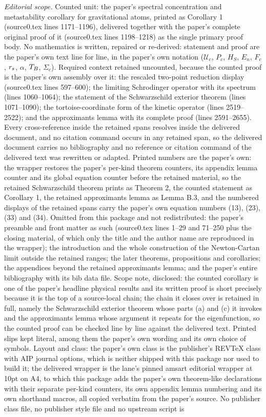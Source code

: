 \documentclass[10pt,a4paper]{amsart}
\theoremstyle{definition}
\theoremstyle{remark}
\begin{document}
\noindent\textit{Editorial scope.} Counted unit: the paper's spectral concentration and metastability corollary for gravitational atoms, printed as Corollary 1 (source0.tex lines 1171--1196), delivered together with the paper's complete original proof of it (source0.tex lines 1198--1218) as the single primary proof body. No mathematics is written, repaired or re-derived: statement and proof are the paper's own text line for line, in the paper's own notation ($\mathcal{U}_c$, $P_c$, $H_S$, $E_n$, $F_c$, $r_{\rm s}$, $\alpha$, $T_{\rm B}$, $\Sigma_c$). Required context retained uncounted, because the counted proof is the paper's own assembly over it: the rescaled two-point reduction display (source0.tex lines 597--600); the limiting Schrodinger operator with its spectrum (lines 1060--1064); the statement of the Schwarzschild exterior theorem (lines 1071--1090); the tortoise-coordinate form of the kinetic operator (lines 2519--2522); and the approximants lemma with its complete proof (lines 2591--2655). Every cross-reference inside the retained spans resolves inside the delivered document, and no citation command occurs in any retained span, so the delivered document carries no bibliography and no reference or citation command of the delivered text was rewritten or adapted. Printed numbers are the paper's own: the wrapper restores the paper's per-kind theorem counters, its appendix lemma counter and its global equation counter before the retained material, so the retained Schwarzschild theorem prints as Theorem 2, the counted statement as Corollary 1, the retained approximants lemma as Lemma B.3, and the numbered displays of the retained spans carry the paper's own equation numbers (13), (23), (33) and (34). Omitted from this package and not redistributed: the paper's preamble and front matter as such (source0.tex lines 1--29 and 71--250 plus the closing material, of which only the title and the author name are reproduced in the wrapper); the introduction and the whole construction of the Newton-Cartan limit outside the retained ranges; the later theorems, propositions and corollaries; the appendices beyond the retained approximants lemma; and the paper's entire bibliography with its bib data file. Scope note, disclosed: the counted corollary is one of the paper's headline physical results and its written proof is short precisely because it is the top of a source-local chain; the chain it closes over is retained in full, namely the Schwarzschild exterior theorem whose parts (a) and (c) it invokes and the approximants lemma whose argument it repeats for the eigenfunction, so the counted proof can be checked line by line against the delivered text. Printed slips kept literal, among them the paper's own wording and its own choice of symbols. Layout and class: the paper's own class is the publisher's REVTeX class with AIP journal options, which is neither shipped with this package nor used to build it; the delivered wrapper is the lane's pinned amsart editorial wrapper at 10pt on A4, to which this package adds the paper's own theorem-like declarations with their separate per-kind counters, its own appendix lemma numbering and its own shorthand macros, all copied verbatim from the paper's source. No publisher class file, no publisher style file and no upstream script is 
\end{document}

